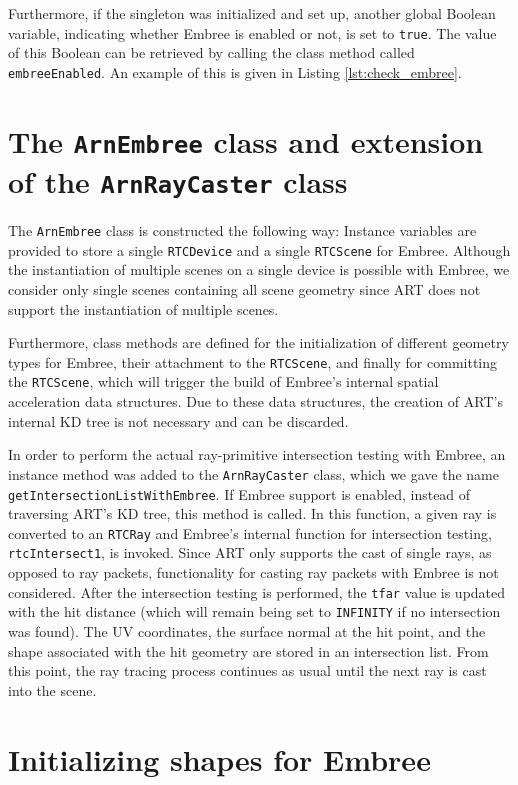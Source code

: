 Furthermore, if the singleton was initialized and set up, another global Boolean variable, indicating whether Embree is enabled or not, is set to \texttt{true}. The value of this Boolean can be retrieved by calling the class method called \texttt{embreeEnabled}. An example of this is given in Listing \ref{lst:check_embree}.

\section{The \texttt{ArnEmbree} class and extension of the \texttt{ArnRayCaster} class}

The \texttt{ArnEmbree} class is constructed the following way: Instance variables are provided to store a single \texttt{RTCDevice} and a single \texttt{RTCScene} for Embree. Although the instantiation of multiple scenes on a single device is possible with Embree, we consider only single scenes containing all scene geometry since ART does not support the instantiation of multiple scenes.

Furthermore, class methods are defined for the initialization of different geometry types for Embree, their attachment to the \texttt{RTCScene}, and finally for committing the \texttt{RTCScene}, which will trigger the build of Embree's internal spatial acceleration data structures. Due to these data structures, the creation of ART's internal KD tree is not necessary and can be discarded.

In order to perform the actual ray-primitive intersection testing with Embree, an instance method was added to the \texttt{ArnRayCaster} class, which we gave the name \texttt{getIntersectionListWithEmbree}. If Embree support is enabled, instead of traversing ART's KD tree, this method is called. In this function, a given ray is converted to an \texttt{RTCRay} and Embree's internal function for intersection testing, \texttt{rtcIntersect1}, is invoked. Since ART only supports the cast of single rays, as opposed to ray packets, functionality for casting ray packets with Embree is not considered. After the intersection testing is performed, the \texttt{tfar} value is updated with the hit distance (which will remain being set to \texttt{INFINITY} if no intersection was found). The UV coordinates, the surface normal at the hit point, and the shape associated with the hit geometry are stored in an intersection list. From this point, the ray tracing process continues as usual until the next ray is cast into the scene.

\section{Initializing shapes for Embree}

